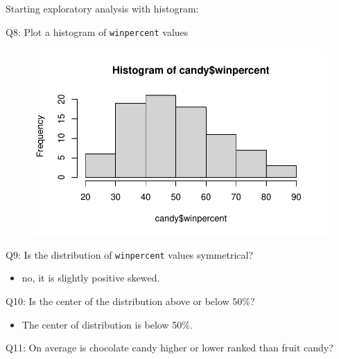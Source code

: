 \documentclass[
  letterpaper,
  DIV=11,
  numbers=noendperiod]{scrartcl}
\newenvironment{Shaded}{\begin{snugshade}}{\end{snugshade}}
\newcommand{\FunctionTok}[1]{\textcolor[rgb]{0.28,0.35,0.67}{#1}}
\newcommand{\NormalTok}[1]{\textcolor[rgb]{0.00,0.23,0.31}{#1}}
\newcommand{\OtherTok}[1]{\textcolor[rgb]{0.00,0.23,0.31}{#1}}
\newcommand{\SpecialCharTok}[1]{\textcolor[rgb]{0.37,0.37,0.37}{#1}}
\providecommand{\tightlist}{%
  \setlength{\itemsep}{0pt}\setlength{\parskip}{0pt}}\usepackage{longtable,booktabs,array}
\begin{document}
Starting exploratory analysis with histogram:

Q8: Plot a histogram of \texttt{winpercent} values

\begin{Shaded}
\end{Shaded}

\begin{figure}[H]

{\centering \includegraphics{class10_project_files/figure-pdf/unnamed-chunk-8-1.pdf}

}

\end{figure}

Q9: Is the distribution of \texttt{winpercent} values symmetrical?

\begin{itemize}
\tightlist
\item
  no, it is slightly positive skewed.
\end{itemize}

Q10: Is the center of the distribution above or below 50\%?

\begin{itemize}
\tightlist
\item
  The center of distribution is below 50\%.
\end{itemize}

Q11: On average is chocolate candy higher or lower ranked than fruit
candy?

\begin{Shaded}
\end{Shaded}
\end{document}
